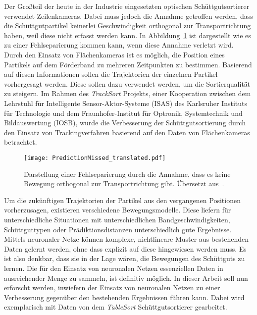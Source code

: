 
Der Großteil der heute in der Industrie eingesetzten optischen Schüttgutsortierer verwendet Zeilenkameras.
Dabei muss jedoch die Annahme getroffen werden, dass die Schüttgutpartikel keinerlei Geschwindigkeit orthogonal zur Transportrichtung haben,
weil diese nicht erfasst werden kann.
In Abbildung~\ref{fig:predMissed} ist dargestellt wie es zu einer Fehlseparierung kommen kann, wenn diese Annahme verletzt wird. \\
Durch den Einsatz von Flächenkameras ist es möglich, die Position eines Partikels auf dem Förderband zu mehreren Zeitpunkten zu bestimmen.
Basierend auf diesen Informationen sollen die Trajektorien der einzelnen Partikel vorhergesagt werden.
Diese sollen dazu verwendet werden, um die Sortierqualität zu steigern. 
Im Rahmen des \textit{TrackSort} Projekts, 
einer Kooperation zwischen dem Lehrstuhl für Intelligente Sensor-Aktor-Systeme (ISAS) des Karlsruher Instituts für Technologie
und dem Fraunhofer-Institut für Optronik, Systemtechnik und Bildauswertung (IOSB), 
wurde die Verbesserung der Schüttgutsortierung durch den Einsatz von Trackingverfahren basierend auf den Daten von Flächenkameras betrachtet.

\begin{figure}[h]
    \centering
    \texttt{[image: PredictionMissed\_translated.pdf]}
    \caption{Darstellung einer Fehlseparierung durch die Annahme, dass es keine Bewegung orthogonal zur Transportrichtung gibt. 
    Übersetzt aus~\cite{Pfaff2018}.}
    \label{fig:predMissed}
\end{figure}


Um die zukünftigen Trajektorien der Partikel aus den vergangenen Positionen vorherzusagen, existieren verschiedene Bewegungsmodelle.
Diese liefern für unterschiedliche Situationen mit unterschiedlichen Bandgeschwindigkeiten, Schüttguttypen oder Prädiktionsdistanzen unterschiedlich gute Ergebnisse.  
Mittels neuronaler Netze können komplexe, nichtlineare Muster aus bestehenden Daten gelernt werden, ohne dass explizit auf diese hingewiesen werden muss.
Es ist also denkbar, dass sie in der Lage wären, die Bewegungen des Schüttguts zu lernen.
Die für den Einsatz von neuronalen Netzen essenziellen Daten in ausreichender Menge zu sammeln, ist definitiv möglich. 
In dieser Arbeit soll nun erforscht werden, inwiefern der Einsatz von neuronalen Netzen zu einer Verbesserung gegenüber den bestehenden Ergebnissen führen kann.
Dabei wird exemplarisch mit Daten von dem \textit{TableSort} Schüttgutsortierer gearbeitet.

